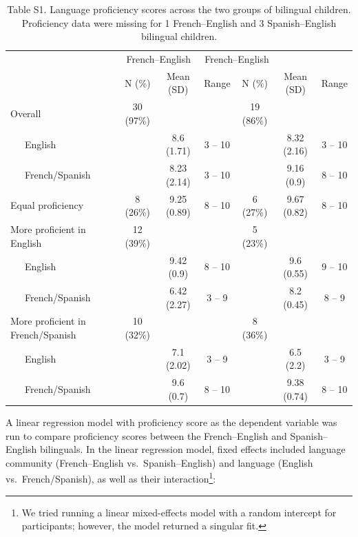 \documentclass[
  man,floatsintext]{apa7}
\begin{document}
\begin{table}[H]

\begin{center}
\begin{threeparttable}

\caption{\label{tab:unnamed-chunk-3}Table S1. Language proficiency scores across the two groups of bilingual children. Proficiency data were missing for 1 French–English and 3 Spanish–English bilingual children.}

\begin{tabular}{lcccccc}
\toprule
 & \multicolumn{2}{c}{French–English} & \multicolumn{2}{c}{French–English} \\
\cmidrule(r){2-4} \cmidrule(r){5-7}
  & \multicolumn{1}{c}{N (\%)} & \multicolumn{1}{c}{Mean (SD)} & \multicolumn{1}{c}{Range} & \multicolumn{1}{c}{N (\%)} & \multicolumn{1}{c}{Mean (SD)} & \multicolumn{1}{c}{Range}\\
\midrule
Overall & 30 (97\%) &  &  & 19 (86\%) &  & \\
\ \ \  English &  & 8.6 (1.71) & 3 – 10 &  & 8.32 (2.16) & 3 – 10\\
\ \ \  French/Spanish &  & 8.23 (2.14) & 3 – 10 &  & 9.16 (0.9) & 8 – 10\\
Equal proficiency & 8 (26\%) & 9.25 (0.89) & 8 – 10 & 6 (27\%) & 9.67 (0.82) & 8 – 10\\
More proficient in English & 12 (39\%) &  &  & 5 (23\%) &  & \\
\ \ \  English &  & 9.42 (0.9) & 8 – 10 &  & 9.6 (0.55) & 9 – 10\\
\ \ \  French/Spanish &  & 6.42 (2.27) & 3 – 9 &  & 8.2 (0.45) & 8 – 9\\
More proficient in French/Spanish & 10 (32\%) &  &  & 8 (36\%) &  & \\
\ \ \  English &  & 7.1 (2.02) & 3 – 9 &  & 6.5 (2.2) & 3 – 9\\
\ \ \  French/Spanish &  & 9.6 (0.7) & 8 – 10 &  & 9.38 (0.74) & 8 – 10\\
\bottomrule
\end{tabular}

\end{threeparttable}
\end{center}

\end{table}

A linear regression model with proficiency score as the dependent variable was run to compare proficiency scores between the French--English and Spanish--English bilinguals. In the linear regression model, fixed effects included language community (French--English vs.~Spanish--English) and language (English vs.~French/Spanish), as well as their interaction\footnote{We tried running a linear mixed-effects model with a random intercept for participants; however, the model returned a singular fit.}:
\end{document}
